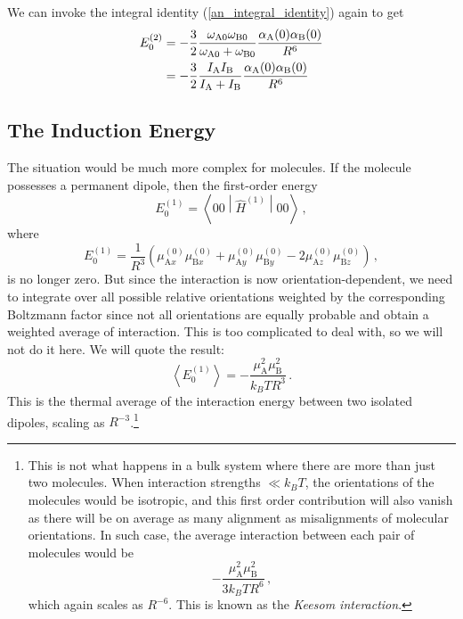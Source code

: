 \documentclass{article}
\theoremstyle{plain}\theoremheaderfont{\normalfont\itshape}\theorembodyfont{\rmfamily}\theoremseparator{.}\newtheorem*{rem}{Remark}\newtheorem*{ex}{Example}\newtheorem*{proof}{Proof}\newtheorem*{altp}{Alternative proof}
\theoremstyle{plain}\theoremheaderfont{\normalfont\bfseries}\theorembodyfont{\rmfamily}\theoremseparator{.}\newtheorem{thm}{Theorem}[section]\newtheorem{lem}[thm]{Lemma}\newtheorem{prop}[thm]{Proposition}\newtheorem*{cor}{Corollary}\newtheorem{defn}[thm]{Definition}\newtheorem{clm}[thm]{Claim}\newtheorem{clminproof}{Claim}
\theoremstyle{break}\theoremheaderfont{\normalfont\itshape}\theorembodyfont{\rmfamily}\theoremseparator{.\medskip}\newtheorem*{proofskip}{Proof}\newtheorem*{exs}{Examples}\newtheorem*{rems}{Remarks}
\theoremstyle{break}\theoremheaderfont{\normalfont\bfseries}\theorembodyfont{\rmfamily}\theoremseparator{.\medskip}\newtheorem{lemskip}[thm]{Lemma}\newtheorem{defnskip}[thm]{Definition}\newtheorem{propskip}[thm]{Proposition}\newtheorem{thmskip}[thm]{Theorem}
\numberwithin{equation}{section}
\newcommand{\eval}[1]{\left\langle #1 \right\rangle}
\newcommand{\expval}[2]{\left\langle #2 \middle| #1 \middle| #2 \right\rangle}
\renewcommand{\AA}{\mathrm{A}}
\newcommand{\BB}{\mathrm{B}}
\begin{document}
    We can invoke the integral identity (\ref{an_integral_identity}) again to get
    \begin{align}
        E_0^{(2)}&=-\frac{3}{2}\frac{\omega_{\AA 0}\omega_{\BB 0}}{\omega_{\AA 0} + \omega_{\BB 0}}\frac{\alpha_{\AA}(0)\alpha_{\BB}(0)}{R^6}\notag\\
        &=-\frac{3}{2}\frac{I_{\AA}I_{\BB}}{I_{\AA} + I_{\BB}}\frac{\alpha_{\AA}(0)\alpha_{\BB}(0)}{R^6}
    \end{align}

    \subsection{The Induction Energy}
    The situation would be much more complex for molecules. If the molecule possesses a permanent dipole, then the first-order energy
    \begin{equation}
        E_0^{(1)}=\expval{\hat{H}^{(1)}}{00}\,,
    \end{equation}
    where
    \begin{equation}
        E_0^{(1)}=\frac{1}{R^3}(\mu_{\AA x}^{(0)}\mu_{\BB x}^{(0)}+\mu_{\AA y}^{(0)}\mu_{\BB y}^{(0)}-2\mu_{\AA z}^{(0)}\mu_{\BB z}^{(0)})\,,
    \end{equation}
    is no longer zero. But since the interaction is now orientation-dependent, we need to integrate over all possible relative orientations weighted by the corresponding Boltzmann factor since not all orientations are equally probable and obtain a weighted average of interaction. This is too complicated to deal with, so we will not do it here. We will quote the result:
    \begin{equation}
        \eval{E_0^{(1)}}=-\frac{\mu_{\AA}^2\mu_{\BB}^2}{k_B TR^3}\,.
    \end{equation}
    This is the thermal average of the interaction energy between two isolated dipoles, scaling as \(R^{-3}\).\footnote{This is not what happens in a bulk system where there are more than just two molecules. When interaction strengths \(\ll k_B T\), the orientations of the molecules would be isotropic, and this first order contribution will also vanish as there will be on average as many alignment as misalignments of molecular orientations. In such case, the average interaction between each pair of molecules would be
    \begin{equation}
        -\frac{\mu_\AA^2\mu_\BB^2}{3k_B T R^6}\,,
    \end{equation}
    which again scales as \(R^{-6}\). This is known as the \textit{Keesom interaction}.}
\end{document}
